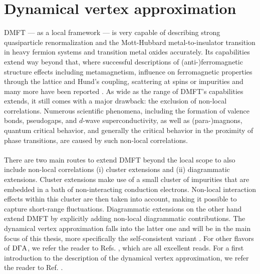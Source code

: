 \documentclass[../../main.tex]{subfiles}
\begin{document}
\section{Dynamical vertex approximation}\label{sec:dga}

DMFT --- as a local framework --- is very capable of describing strong quasiparticle renormalization and the Mott-Hubbard metal-to-insulator transition in heavy fermion systems and transition metal oxides accurately. Its capabilities extend way beyond that, where successful descriptions of (anti-)ferromagnetic structure effects including metamagnetism, influence on ferromagnetic properties through the lattice and Hund's coupling, scattering at spins or impurities and many more have been reported \cite{held dmft}. As wide as the range of DMFT's capabilities extends, it still comes with a major drawback: the exclusion of non-local correlations. Numerous scientific phenomena, including the formation of valence bonds, pseudogaps, and $d$-wave superconductivity, as well as (para-)magnons, quantum critical behavior, and generally the critical behavior in the proximity of phase transitions, are caused by such non-local correlations.
\\\\
There are two main routes to extend DMFT beyond the local scope to also include non-local correlations \cite{rohringer two particle} (i) cluster extensions and (ii) diagrammatic extensions. Cluster extensions make use of a small cluster of impurities that are embedded in a bath of non-interacting conduction electrons. Non-local interaction effects within this cluster are then taken into account, making it possible to capture short-range fluctuations. Diagrammatic extensions on the other hand extend DMFT by explicitly adding non-local diagrammatic contributions. The dynamical vertex approximation falls into the latter one and will be in the main focus of this thesis, more specifically the self-consistent  variant \cite{josef sc dga}. For other flavors of $\text{D}\Gamma\text{A}$, we refer the reader to Refs. \cite{del re, valli nanorings, schäfer multimethod, kat.tos.held 2009}, which are all excellent reads. For a first introduction to the  description of the dynamical vertex approximation, we refer the reader to Ref. \cite{kat.tos.held 2007}. 
\\\\
\end{document}
